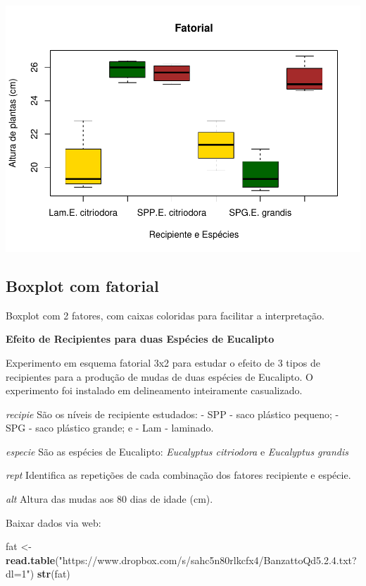 \documentclass[
]{book}
\newenvironment{Shaded}{\begin{snugshade}}{\end{snugshade}}
\newcommand{\KeywordTok}[1]{\textcolor[rgb]{0.13,0.29,0.53}{\textbf{#1}}}
\newcommand{\NormalTok}[1]{#1}
\newcommand{\StringTok}[1]{\textcolor[rgb]{0.31,0.60,0.02}{#1}}
\begin{document}
\includegraphics{TudodoR_files/figure-latex/unnamed-chunk-174-1.pdf}

\hypertarget{boxplot-com-fatorial}{%
\subsection{Boxplot com fatorial}\label{boxplot-com-fatorial}}

Boxplot com 2 fatores, com caixas coloridas para facilitar a interpretação.

\textbf{Efeito de Recipientes para duas Espécies de Eucalipto}

Experimento em esquema fatorial 3x2 para estudar o efeito de 3 tipos de recipientes para a produção de mudas de duas espécies de Eucalipto. O experimento foi instalado em delineamento inteiramente casualizado.

\emph{recipie}
São os níveis de recipiente estudados:
- SPP - saco plástico pequeno;
- SPG - saco plástico grande; e
- Lam - laminado.

\emph{especie}
São as espécies de Eucalipto: \emph{Eucalyptus citriodora} e \emph{Eucalyptus grandis}

\emph{rept}
Identifica as repetições de cada combinação dos fatores recipiente e espécie.

\emph{alt}
Altura das mudas aos 80 dias de idade (cm).

Baixar dados via web:

\begin{Shaded}
\begin{Highlighting}[]
\NormalTok{fat <-}\StringTok{ }\KeywordTok{read.table}\NormalTok{(}\StringTok{"https://www.dropbox.com/s/sahc5n80rlkcfx4/BanzattoQd5.2.4.txt?dl=1"}\NormalTok{)}
\KeywordTok{str}\NormalTok{(fat)}
\end{Highlighting}
\end{Shaded}
\end{document}
